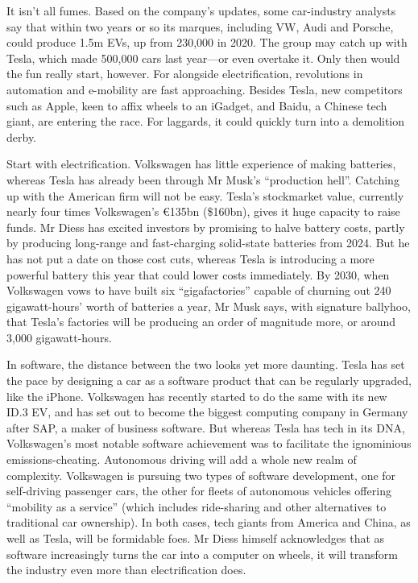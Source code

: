 \documentclass{article}
\begin{document}
It isn't all fumes. Based on the company's updates, some car-industry analysts say that within two years or so its marques, including VW, Audi and Porsche, could produce 1.5m EVs, up from 230,000 in 2020. The group may catch up with Tesla, which made 500,000 cars last year---or even overtake it. Only then would the fun really start, however. For alongside electrification, revolutions in automation and e-mobility are fast approaching. Besides Tesla, new competitors such as Apple, keen to affix wheels to an iGadget, and Baidu, a Chinese tech giant, are entering the race. For laggards, it could quickly turn into a demolition derby. 

Start with electrification. Volkswagen has little experience of making batteries, whereas Tesla has already been through Mr Musk's ``production hell''. Catching up with the American firm will not be easy. Tesla's stockmarket value, currently nearly four times Volkswagen's €135bn (\$160bn), gives it huge capacity to raise funds. Mr Diess has excited investors by promising to halve battery costs, partly by producing long-range and fast-charging solid-state batteries from 2024. But he has not put a date on those cost cuts, whereas Tesla is introducing a more powerful battery this year that could lower costs immediately. By 2030, when Volkswagen vows to have built six ``gigafactories'' capable of churning out 240 gigawatt-hours' worth of batteries a year, Mr Musk says, with signature ballyhoo, that Tesla's factories will be producing an order of magnitude more, or around 3,000 gigawatt-hours. 

In software, the distance between the two looks yet more daunting. Tesla has set the pace by designing a car as a software product that can be regularly upgraded, like the iPhone. Volkswagen has recently started to do the same with its new ID.3 EV, and has set out to become the biggest computing company in Germany after SAP, a maker of business software. But whereas Tesla has tech in its DNA, Volkswagen's most notable software achievement was to facilitate the ignominious emissions-cheating. Autonomous driving will add a whole new realm of complexity. Volkswagen is pursuing two types of software development, one for self-driving passenger cars, the other for fleets of autonomous vehicles offering ``mobility as a service'' (which includes ride-sharing and other alternatives to traditional car ownership). In both cases, tech giants from America and China, as well as Tesla, will be formidable foes. Mr Diess himself acknowledges that as software increasingly turns the car into a computer on wheels, it will transform the industry even more than electrification does. 
\end{document}
